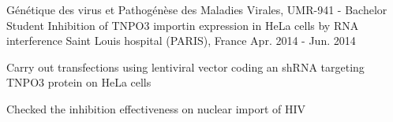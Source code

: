 \begin{cventries}
  \cventry
    {Génétique des virus et Pathogénèse des Maladies Virales, UMR-941 - Bachelor Student} %
    {Inhibition of TNPO3 importin expression in HeLa cells by RNA interference} %
    {Saint Louis hospital (PARIS), France} %
    {Apr. 2014 - Jun. 2014} %
    {
      \begin{cvitems} %
        \item {Carry out transfections using lentiviral vector coding an shRNA targeting TNPO3 protein on HeLa cells}
        \item {Checked the inhibition effectiveness on nuclear import of HIV}
      \end{cvitems}
    }

\end{cventries}
